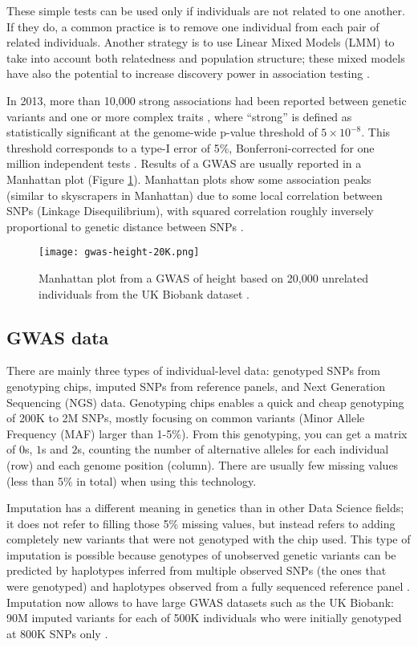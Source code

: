 These simple tests can be used only if individuals are not related to one another. If they do, a common practice is to remove one individual from each pair of related individuals. Another strategy is to use Linear Mixed Models (LMM) to take into account both relatedness and population structure; these mixed models have also the potential to increase discovery power in association testing \cite[]{yang2014advantages}.

In 2013, more than 10,000 strong associations had been reported between genetic variants and one or more complex traits \cite[]{welter2013nhgri}, where ``strong'' is defined as statistically significant at the genome-wide p-value threshold of $5 \times 10^{-8}$. This threshold corresponds to a type-I error of 5\%, Bonferroni-corrected for one million independent tests \cite[]{pe2008estimation}. Results of a GWAS are usually reported in a Manhattan plot (Figure \ref{fig:gwas}). 
Manhattan plots show some association peaks (similar to skyscrapers in Manhattan) due to some local correlation between SNPs (Linkage Disequilibrium), with squared correlation roughly inversely proportional to genetic distance between SNPs \cite[]{hudson2001two}.

\begin{figure}[htb]
\centerline{\texttt{[image: gwas-height-20K.png]}}
\caption{Manhattan plot from a GWAS of height based on 20,000 unrelated individuals from the UK Biobank dataset \cite[]{bycroft2017genome}.}\label{fig:gwas}
\end{figure}


\subsection{GWAS data}

There are mainly three types of individual-level data: genotyped SNPs from genotyping chips, imputed SNPs from reference panels, and Next Generation Sequencing (NGS) data.
Genotyping chips enables a quick and cheap genotyping of 200K to 2M SNPs, mostly focusing on common variants (Minor Allele Frequency (MAF) larger than 1-5\%). From this genotyping, you can get a matrix of $0$s, $1$s and $2$s, counting the number of alternative alleles for each individual (row) and each genome position (column). There are usually few missing values (less than 5\% in total) when using this technology.

Imputation has a different meaning in genetics than in other Data Science fields; it does not refer to filling those 5\% missing values, but instead refers to adding completely new variants that were not genotyped with the chip used. 
This type of imputation is possible because genotypes of unobserved genetic variants can be predicted by haplotypes inferred from multiple observed SNPs (the ones that were genotyped) and haplotypes observed from a fully sequenced reference panel \cite[]{marchini2010genotype,mccarthy2016reference}.
Imputation now allows to have large GWAS datasets such as the UK Biobank: 90M imputed variants for each of 500K individuals who were initially genotyped at 800K SNPs only \cite[]{bycroft2017genome}.

